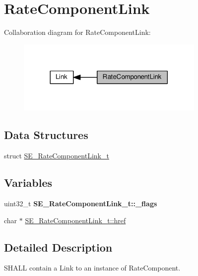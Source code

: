 \hypertarget{group__RateComponentLink}{}\section{Rate\+Component\+Link}
\label{group__RateComponentLink}
Collaboration diagram for Rate\+Component\+Link\+:\nopagebreak
\begin{figure}[H]
\begin{center}
\leavevmode
\includegraphics[width=257pt]{group__RateComponentLink}
\end{center}
\end{figure}
\subsection*{Data Structures}
\begin{DoxyCompactItemize}
\item 
struct \hyperlink{structSE__RateComponentLink__t}{S\+E\+\_\+\+Rate\+Component\+Link\+\_\+t}
\end{DoxyCompactItemize}
\subsection*{Variables}
\begin{DoxyCompactItemize}
\item 
\mbox{\label{group__RateComponentLink_ga80945f67c63fc2f0275a3d044ea79122}} 
uint32\+\_\+t {\bfseries S\+E\+\_\+\+Rate\+Component\+Link\+\_\+t\+::\+\_\+flags}
\item 
char $\ast$ \hyperlink{group__RateComponentLink_ga9b15f31245892969d5eb7efb8f1a42b4}{S\+E\+\_\+\+Rate\+Component\+Link\+\_\+t\+::href}
\end{DoxyCompactItemize}


\subsection{Detailed Description}
S\+H\+A\+LL contain a Link to an instance of Rate\+Component. 

